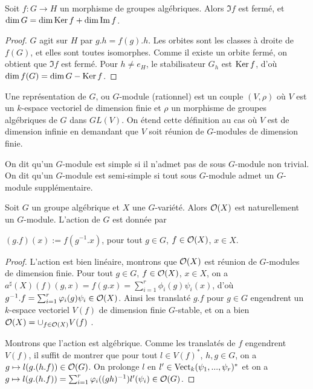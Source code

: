 \begin{prop}
Soit $f:G\rightarrow H$ un morphisme de groupes algébriques. Alors $\Im f$ est fermé, et $\dim G=\dim\operatorname{Ker} f+\dim\operatorname{Im} f$.
\end{prop}
\begin{proof}
$G$ agit sur $H$ par $g.h=f(g).h$. Les orbites sont les classes à droite de $f(G)$, et elles sont toutes isomorphes. Comme il existe un orbite fermé, on obtient que $\Im f$ est fermé. Pour $h\neq e_H$, le stabilisateur $G_h$ est $\operatorname{Ker} f$, d'où $\dim f(G)=\dim G-\operatorname{Ker} f$.
\end{proof}


\begin{defn}
Une représentation de $G$, ou $G$-module (rationnel) est un couple $(V, \rho)$ où $V$ est un $k$-espace vectoriel de dimension finie et $\rho$ un morphisme de groupes algébriques de $G$ dans $GL(V)$. On étend cette définition au cas où $V$ est de dimension infinie en demandant que $V$ soit réunion de $G$-modules de dimension finie.

On dit qu'un $G$-module est simple si il n'admet pas de sous $G$-module non trivial. On dit qu'un $G$-module est semi-simple si tout sous $G$-module admet un $G$-module supplémentaire.
\end{defn}

\begin{prop}\label{GmoduleSectionsGlobales}
Soit $G$ un groupe algébrique et $X$ une $G$-variété. Alors $\mathcal{O}(X)$ est naturellement un $G$-module. L'action de $G$ est donnée par
\begin{center}
$(g.f)(x):=f(g^{-1}.x)$, pour tout $g\in G$, $f\in \mathcal{O}(X)$, $x\in X$. 
\end{center}
\end{prop}
\begin{proof}
L'action est bien linéaire, montrons que $\mathcal{O}(X)$ est réunion de $G$-modules de dimension finie. Pour tout $g\in G$, $f\in \mathcal{O}(X)$, $x\in X$, on a $a^\sharp(X)(f)(g,x)=f(g.x)=\sum_{i=1}^r\phi_i(g)\psi_i(x)$, d'où $g^{-1}.f=\sum_{i=1}^r\varphi_i(g)\psi_i\in \mathcal{O}(X)$. Ainsi les translaté $g.f$ pour $g\in G$ engendrent un $k$-espace vectoriel $V(f)$ de dimension finie $G$-stable, et on a bien $\mathcal{O}(X)=\cup_{f\in \mathcal{O}(X)}V(f)$ .

Montrons que l'action est algébrique. Comme les translatés de $f$ engendrent $V(f)$, il suffit de montrer que pour tout $l\in V(f)^*$, $h,g\in G$, on a $g\mapsto l(g.(h.f))\in \mathcal{O}(G)$. On prolonge $l$ en $l'\in \operatorname{Vect}_k(\psi_1,...,\psi_r)^*$ et on a $ g\mapsto l(g.(h.f))=\sum_{i=1}^r\varphi_i((gh)^{-1})l'(\psi_i)\in \mathcal{O}(G)$.
\end{proof}

